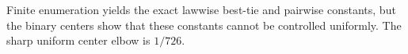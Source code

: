 Finite enumeration yields the exact lawwise best-tie and pairwise constants, but the binary centers show that these constants cannot be controlled uniformly. The sharp uniform center elbow is \(1/726\).
